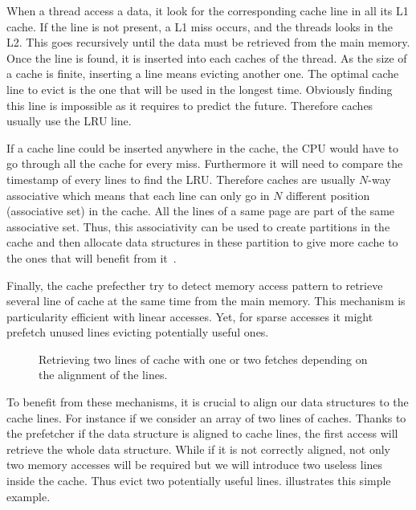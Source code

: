 When a thread access a data, it look for the corresponding cache line in all its L1 cache.
If the line is not present, a L1 miss occurs, and the threads looks in the L2.
This goes recursively until the data must be retrieved from the main memory.
Once the line is found, it is inserted into each caches of the thread.
As the size of a cache is finite, inserting a line means evicting another one.
The optimal cache line to evict is the one that will be used in the longest time.
Obviously finding this line is impossible as it requires to predict the future.
Therefore caches usually use the \acrfull{LRU} line.

If a cache line could be inserted anywhere in the cache, the \gls{CPU} would have to go through all the cache for every miss.
Furthermore it will need to compare the timestamp of every lines to find the \gls{LRU}.
Therefore caches are usually $N$-way associative which means that each line can only go in $N$ different position (associative set) in the cache.
All the lines of a same page are part of the same associative set.
Thus, this associativity can be used to create partitions in the cache and then allocate data structures in these partition to give more cache to the ones that will benefit from it~\cite{Perarnau11Controlling}.

Finally, the cache prefecther try to detect memory access pattern to retrieve several line of cache at the same time from the main memory.
This mechanism is particularity efficient with linear accesses.
Yet, for sparse accesses it might prefetch unused lines evicting potentially useful ones.

\begin{figure}[htb]
    \centering
    
    \caption[Example of bad alignment.]{Retrieving two lines of cache with one or two fetches depending on the alignment of the lines.}
    \label{fig:bad-align}
\end{figure}

To benefit from these mechanisms, it is crucial to align our data structures to the cache lines.
For instance if we consider an array of two lines of caches.
Thanks to the prefetcher if the data structure is aligned to cache lines, the first access will retrieve the whole data structure.
While if it is not correctly aligned, not only two memory accesses will be required but we will introduce two useless lines inside the cache.
Thus evict two potentially useful lines.
 illustrates this simple example.

